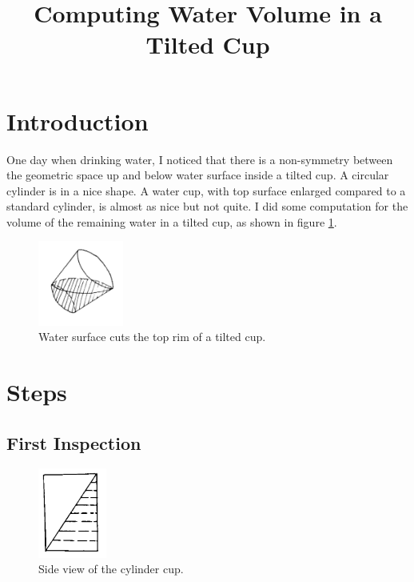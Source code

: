 \documentclass[a4paper]{article}
\title{Computing Water Volume in a Tilted Cup}
\begin{document}
\date{}
\maketitle

\section{Introduction}

One day when drinking water, I noticed that there is a non-symmetry between the geometric space up and below water surface inside a tilted cup. A circular cylinder is in a nice shape. A water cup, with top surface enlarged compared to a standard cylinder, is almost as nice but not quite. I did some computation for the volume of the remaining water in a tilted cup, as shown in figure \ref{fig:1}.

\begin{figure}[h]
\centering
\includegraphics[width=0.25\textwidth]{fig/1.png}
\caption{\label{fig:1}Water surface cuts the top rim of a tilted cup.}
\end{figure}

\section{Steps}

\subsection{First Inspection}

\begin{figure}
\centering
\includegraphics[width=0.2\textwidth]{fig/2.png}
\caption{\label{fig:2}Side view of the cylinder cup.}
\end{figure}
\end{document}
